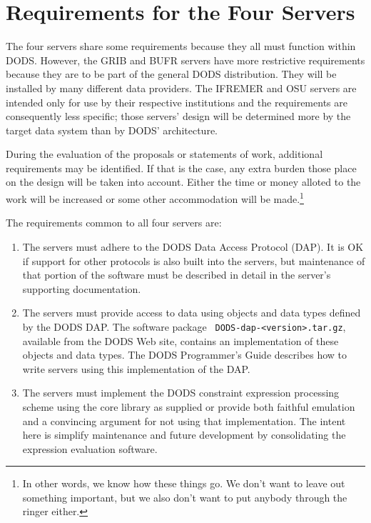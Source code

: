 \documentclass[12pt]{article}
\begin{document}
\section{Requirements for the Four Servers}

The four servers share some requirements because they all must function
within DODS. However, the GRIB and BUFR servers have more restrictive
requirements because they are to be part of the general DODS distribution.
They will be installed by many different data providers. The IFREMER and OSU
servers are intended only for use by their respective institutions and the
requirements are consequently less specific; those servers' design will be
determined more by the target data system than by DODS' architecture.

During the evaluation of the proposals or statements of work, additional
requirements may be identified. If that is the case, any extra burden those
place on the design will be taken into account. Either the time or money
alloted to the work will be increased or some other accommodation will be
made.\footnote{In other words, we know how these things go. We don't want to
  leave out something important, but we also don't want to put anybody
  through the ringer either.}

The requirements common to all four servers are:

\begin{enumerate}
  
\item The servers must adhere to the DODS Data Access Protocol (DAP). It is
  OK if support for other protocols is also built into the servers, but
  maintenance of that portion of the software must be described in detail in
  the server's supporting documentation.
  
\item The servers must provide access to data using objects and data types
  defined by the DODS DAP. The software package {\tt
    DODS-dap-<version>.tar.gz}, available from the DODS Web site, contains an
  implementation of these objects and data types. The DODS Programmer's Guide
  describes how to write servers using this implementation of the DAP.

\item The servers must implement the DODS constraint expression processing
  scheme using the core library as supplied or provide both faithful
  emulation and a convincing argument for not using that implementation. The
  intent here is simplify maintenance and future development by consolidating
  the expression evaluation software.

\end{enumerate}
\end{document}
